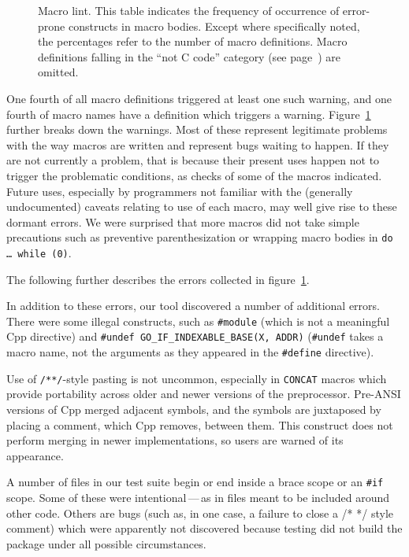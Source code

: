 \documentclass[10pt]{article}
\begin{document}
\begin{figure}
  {\small\centerline{}}
  
  \caption{Macro lint.  This table indicates the frequency of occurrence of
    error-prone constructs in macro bodies.  Except where specifically
    noted, the percentages refer to the number of macro definitions.  Macro
    definitions falling in the ``not C code'' category (see
    page~\pageref{page:not-c-code}) are omitted.}
  \label{fig:macro-lint}
\end{figure}

One fourth of all macro definitions triggered at least one such warning,
and one fourth of macro names have a definition which triggers a warning.
Figure~\ref{fig:macro-lint} further breaks down the warnings.  Most of
these represent legitimate problems with the way macros are written and
represent bugs waiting to happen.  If they are not currently a problem,
that is because their present uses happen not to trigger the problematic
conditions, as checks of some of the macros indicated.  Future uses,
especially by programmers not familiar with the (generally undocumented)
caveats relating to use of each macro, may well give rise to these dormant
errors.  We were surprised that more macros did not take simple precautions
such as preventive parenthesization or wrapping macro bodies in {\tt do
{\rm \ldots} while (0)}.

The following further describes the errors collected in
figure~\ref{fig:macro-lint}.

{}

In addition to these errors, our tool discovered a number of additional
errors.  There were some illegal constructs, such as {\tt \#module} (which
is not a meaningful Cpp directive) and {\tt \#undef
\verb|GO_IF_INDEXABLE_BASE|(X, ADDR)} ({\tt \#undef} takes a macro name,
not the arguments as they appeared in the {\tt \#define} directive).
  
Use of {\tt /**/}-style pasting is not uncommon, especially in {\tt CONCAT}
macros which provide portability across older and newer versions of the
preprocessor.  Pre-ANSI versions of Cpp merged adjacent symbols, and the
symbols are juxtaposed by placing a comment, which Cpp removes, between
them.  This construct does not perform merging in newer implementations,
so users are warned of its appearance.

A number of files in our test suite begin or end inside a brace scope or an
{\tt \#if} scope.  Some of these were intentional\,---\,as in files meant
to be included around other code.  Others are bugs (such as, in one case, a
failure to close a /* */ style comment) which were apparently not
discovered because testing did not build the package under all possible
circumstances.
\end{document}
